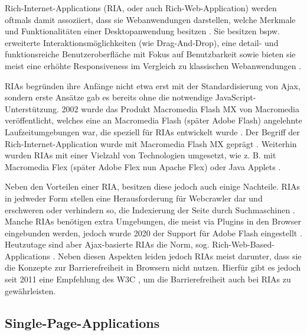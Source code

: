 
Rich-Internet-Applications (RIA, oder auch Rich-Web-Application) werden oftmals damit assoziiert, dass sie Webanwendungen darstellen, welche Merkmale und Funktionalitäten einer Desktopanwendung besitzen \cite{TenYearsOfRIAs} \cite{NecessityOfMethodologiesToModelRIAs}. Sie besitzen bspw. erweiterte Interaktionsmöglichkeiten (wie Drag-And-Drop), eine detail- und funktionsreiche Benutzeroberfläche mit Fokus auf Benutzbarkeit sowie bieten sie meist eine erhöhte Responsiveness im Vergleich zu klassischen Webanwendungen \cite{TenYearsOfRIAs}.

RIAs begründen ihre Anfänge nicht etwa erst mit der Standardisierung von Ajax, sondern erste Ansätze gab es bereits ohne die notwendige JavaScript-Unterstützung. 2002 wurde das Produkt Macromedia Flash MX von Macromedia veröffentlicht, welches eine an Macromedia Flash (später Adobe Flash) angelehnte Laufzeitumgebungen war, die speziell für RIAs entwickelt wurde \cite{MacromediaFlashMXWhitePaper}. Der Begriff der Rich-Internet-Application wurde mit Macromedia Flash MX geprägt \cite{TenYearsOfRIAs}. Weiterhin wurden RIAs mit einer Vielzahl von Technologien umgesetzt, wie z. B. mit Macromedia Flex (später Adobe Flex nun Apache Flex) oder Java Applets \cite{NecessityOfMethodologiesToModelRIAs} \cite{RIAsTheNextStageOfApplicationDevelopment} \cite{RichInternetApplications} \cite{FinkIntroducingSPAs}.

Neben den Vorteilen einer RIA, besitzen diese jedoch auch einige Nachteile. RIAs in jedweder Form stellen eine Herausforderung für Webcrawler dar und erschweren oder verhindern so, die Indexierung der Seite durch Suchmaschinen \cite{CrawlingRIAs}. Manche RIAs benötigen extra Umgebungen, die meist via Plugins in den Browser eingebunden werden, jedoch wurde 2020 der Support für Adobe Flash eingestellt \cite{Netlytic}. Heutzutage sind aber Ajax-basierte RIAs \cite{RIAsTheNextStageOfApplicationDevelopment} die Norm, sog. Rich-Web-Based-Applications \cite{RichWebBasedApplications} \cite{Netlytic}. Neben diesen Aspekten leiden jedoch RIAs meist darunter, dass sie die Konzepte zur Barrierefreiheit in Browsern nicht nutzen. Hierfür gibt es jedoch seit 2011 eine Empfehlung des W3C \cite{W3CAccessibleRIAs}, um die Barrierefreiheit auch bei RIAs zu gewährleisten.

\subsection{Single-Page-Applications}
\label{sec:single-page-applications}

